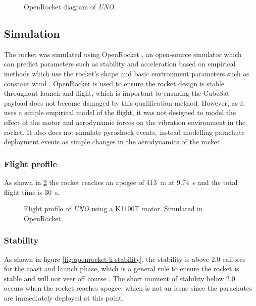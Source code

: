 \documentclass[]{report}
\begin{document}
\begin{figure}[H]
  
  \caption{OpenRocket diagram of \textit{UNO}.}
  \label{fig:openrocket}
\end{figure}

\subsection{Simulation}

The rocket was simulated using OpenRocket \cite{openrocket,niskanen2009}, an open-source simulator which can predict parameters such as stability and acceleration based on empirical methods which use the rocket's shape and basic environment parameters such as constant wind \cite{doi:10.1177/0954410017752730,niskanen2009}. OpenRocket is used to ensure the rocket design is stable throughout launch and flight, which is important to ensuring the CubeSat payload does not become damaged by this qualification method. However, as it uses a simple empirical model of the flight, it was not designed to model the effect of the motor and aerodynamic forces on the vibration environment in the rocket. It also does not simulate pyroshock events, instead modelling parachute deployment events as simple changes in the aerodynamics of the rocket \cite{niskanen2009}.

\subsubsection{Flight profile}

As shown in \ref{fig:openrocket-k-launch} the rocket reaches an apogee of \SI{413}{\metre} at \SI{9.74}{\second} and the total flight time is \SI{30}{\second}.

\begin{figure}[H]
  
  \caption{Flight profile of \textit{UNO} using a K1100T motor. Simulated in OpenRocket.}
  \label{fig:openrocket-k-launch}
\end{figure}


\subsubsection{Stability}

As shown in figure \ref{fig:openrocket-k-stability}, the stability is above 2.0 calibres for the coast and launch phase, which is a general rule to ensure the rocket is stable and will not veer off course \cite{canepa2005modern}. The short moment of stability below 2.0 occurs when the rocket reaches apogee, which is not an issue since the parachutes are immediately deployed at this point.
\end{document}
